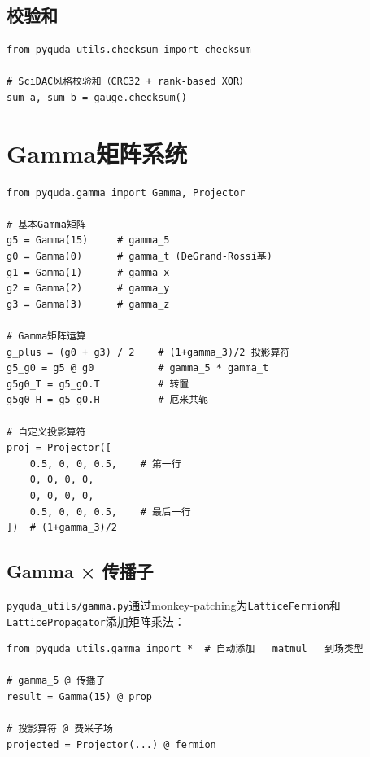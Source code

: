 \documentclass[12pt,a4paper]{ctexart}
\begin{document}
\subsection{校验和}

\begin{lstlisting}[caption={校验和验证}]
from pyquda_utils.checksum import checksum

# SciDAC风格校验和（CRC32 + rank-based XOR）
sum_a, sum_b = gauge.checksum()
\end{lstlisting}

\section{Gamma矩阵系统}

\begin{lstlisting}[caption={Gamma矩阵运算}]
from pyquda.gamma import Gamma, Projector

# 基本Gamma矩阵
g5 = Gamma(15)     # gamma_5
g0 = Gamma(0)      # gamma_t (DeGrand-Rossi基)
g1 = Gamma(1)      # gamma_x
g2 = Gamma(2)      # gamma_y
g3 = Gamma(3)      # gamma_z

# Gamma矩阵运算
g_plus = (g0 + g3) / 2    # (1+gamma_3)/2 投影算符
g5_g0 = g5 @ g0           # gamma_5 * gamma_t
g5g0_T = g5_g0.T          # 转置
g5g0_H = g5_g0.H          # 厄米共轭

# 自定义投影算符
proj = Projector([
    0.5, 0, 0, 0.5,    # 第一行
    0, 0, 0, 0,
    0, 0, 0, 0,
    0.5, 0, 0, 0.5,    # 最后一行
])  # (1+gamma_3)/2
\end{lstlisting}

\subsection{Gamma × 传播子}

\texttt{pyquda\_utils/gamma.py}通过monkey-patching为\texttt{LatticeFermion}和\texttt{LatticePropagator}添加矩阵乘法：

\begin{lstlisting}[caption={Gamma × 传播子操作}]
from pyquda_utils.gamma import *  # 自动添加 __matmul__ 到场类型

# gamma_5 @ 传播子
result = Gamma(15) @ prop

# 投影算符 @ 费米子场
projected = Projector(...) @ fermion
\end{lstlisting}
\end{document}
